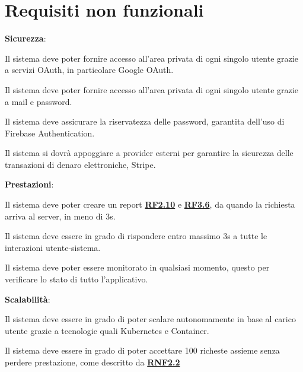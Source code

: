 \newpage
\section{Requisiti non funzionali}

\begin{rnfenum}
    \item \textbf{Sicurezza}:
        
        \begin{rnfenum}
            \item Il sistema deve poter fornire accesso all'area privata di ogni singolo utente grazie a servizi OAuth, in particolare Google OAuth.
            \item Il sistema deve poter fornire accesso all'area privata di ogni singolo utente grazie a mail e password.
            \item Il sistema deve assicurare la riservatezza delle password, garantita dell'uso di Firebase Authentication.
            \item Il sistema si dovrà appoggiare a provider esterni per garantire la sicurezza delle transazioni di denaro elettroniche, Stripe.
        \end{rnfenum}
    
    \item \textbf{Prestazioni}: 

        \begin{rnfenum}
            \item Il sistema deve poter creare un report \textbf{\hyperlink{RF2.10}{RF2.10}} e \textbf{\hyperlink{RF3.6}{RF3.6}}, da quando la richiesta arriva al server, in meno di 3s.
            \item \hypertarget{RNF2.2}{} Il sistema deve essere in grado di rispondere entro massimo 3s a tutte le interazioni utente-sistema.
            \item Il sistema deve poter essere monitorato in qualsiasi momento, questo per verificare lo stato di tutto l'applicativo.
        \end{rnfenum}
    
    \item \textbf{Scalabilità}: 
        \begin{rnfenum}
            \item Il sistema deve essere in grado di poter scalare autonomamente in base al carico utente grazie a tecnologie quali Kubernetes e Container.
            \item Il sistema deve essere in grado di poter accettare 100 richeste assieme senza perdere prestazione, come descritto da \textbf{\hyperlink{RNF2.2}{RNF2.2}}
        \end{rnfenum}


\end{rnfenum}
